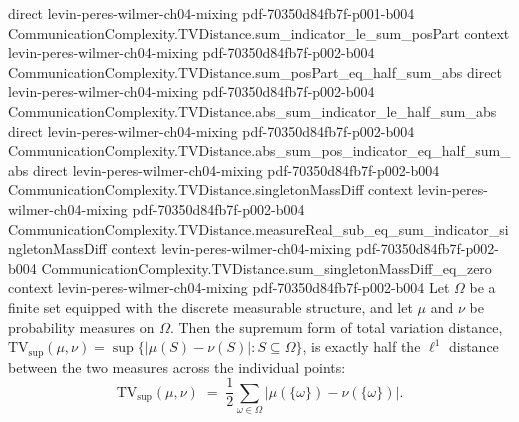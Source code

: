 \begin{theorem}
  {direct}
  {levin-peres-wilmer-ch04-mixing}
  {pdf-70350d84fb7f-p001-b004}
\proofstep
  {CommunicationComplexity.TVDistance.sum_indicator_le_sum_posPart}
  {context}
  {levin-peres-wilmer-ch04-mixing}
  {pdf-70350d84fb7f-p002-b004}
\proofstep
  {CommunicationComplexity.TVDistance.sum_posPart_eq_half_sum_abs}
  {direct}
  {levin-peres-wilmer-ch04-mixing}
  {pdf-70350d84fb7f-p002-b004}
\proofstep
  {CommunicationComplexity.TVDistance.abs_sum_indicator_le_half_sum_abs}
  {direct}
  {levin-peres-wilmer-ch04-mixing}
  {pdf-70350d84fb7f-p002-b004}
\proofstep
  {CommunicationComplexity.TVDistance.abs_sum_pos_indicator_eq_half_sum_abs}
  {direct}
  {levin-peres-wilmer-ch04-mixing}
  {pdf-70350d84fb7f-p002-b004}
\proofstep
  {CommunicationComplexity.TVDistance.singletonMassDiff}
  {context}
  {levin-peres-wilmer-ch04-mixing}
  {pdf-70350d84fb7f-p002-b004}
\proofstep
  {CommunicationComplexity.TVDistance.measureReal_sub_eq_sum_indicator_singletonMassDiff}
  {context}
  {levin-peres-wilmer-ch04-mixing}
  {pdf-70350d84fb7f-p002-b004}
\proofstep
  {CommunicationComplexity.TVDistance.sum_singletonMassDiff_eq_zero}
  {context}
  {levin-peres-wilmer-ch04-mixing}
  {pdf-70350d84fb7f-p002-b004}
Let $\Omega$ be a finite set equipped with the discrete measurable structure, and let
$\mu$ and $\nu$ be probability measures on $\Omega$. Then the supremum form of total
variation distance, $\mathrm{TV}_{\sup}(\mu,\nu) = \sup\{|\mu(S) - \nu(S)| : S \subseteq
\Omega\}$, is exactly half the $\ell^1$ distance between the two measures across the
individual points:
\[
\mathrm{TV}_{\sup}(\mu,\nu) \;=\; \frac{1}{2}\sum_{\omega \in \Omega}
\bigl|\mu(\{\omega\}) - \nu(\{\omega\})\bigr|.
\]
\end{theorem}

